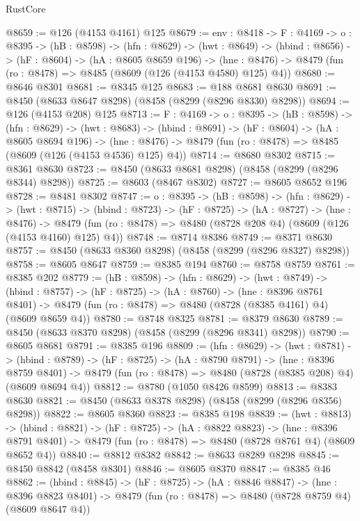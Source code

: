 \begin{lexlean}{RustCore}
\begin{coremodule}
@8659 := @126 (@4153 @4161) @125
@8679 := {env : @8418} ->
  {F : @4169} ->
  {o : @8395} ->
  (hB : @8598) ->
  (hfn : @8629) ->
  (hwt : @8649) ->
  (hbind : @8656) ->
  (hF : @8604) ->
  (hA : @8605 @8659 @196) ->
  (hne : @8476) -> @8479 (fun (ro : @8478) => @8485 (@8609 (@126 (@4153 @4580) @125) @4))
@8680 := @8646 @8301
@8681 := @8345 @125
@8683 := @188 @8681 @8630
@8691 := @8450 (@8633 @8647 @8298) (@8458 (@8299 (@8296 @8330) @8298))
@8694 := @126 (@4153 @208) @125
@8713 := {F : @4169} ->
  {o : @8395} ->
  (hB : @8598) ->
  (hfn : @8629) ->
  (hwt : @8683) ->
  (hbind : @8691) ->
  (hF : @8604) ->
  (hA : @8605 @8694 @196) ->
  (hne : @8476) -> @8479 (fun (ro : @8478) => @8485 (@8609 (@126 (@4153 @4536) @125) @4))
@8714 := @8680 @8302
@8715 := @8361 @8630
@8723 := @8450 (@8633 @8681 @8298) (@8458 (@8299 (@8296 @8344) @8298))
@8725 := @8603 (@8467 @8302)
@8727 := @8605 @8652 @196
@8728 := @8481 @8302
@8747 := {o : @8395} ->
  (hB : @8598) ->
  (hfn : @8629) ->
  (hwt : @8715) ->
  (hbind : @8723) ->
  (hF : @8725) ->
  (hA : @8727) ->
  (hne : @8476) ->
  @8479 (fun (ro : @8478) => @8480 (@8728 @208 @4) (@8609 (@126 (@4153 @4160) @125) @4))
@8748 := @8714 @8386
@8749 := @8371 @8630
@8757 := @8450 (@8633 @8360 @8298) (@8458 (@8299 (@8296 @8327) @8298))
@8758 := @8605 @8647
@8759 := @8385 @194
@8760 := @8758 @8759
@8761 := @8385 @202
@8779 := (hB : @8598) ->
  (hfn : @8629) ->
  (hwt : @8749) ->
  (hbind : @8757) ->
  (hF : @8725) ->
  (hA : @8760) ->
  (hne : @8396 @8761 @8401) ->
  @8479 (fun (ro : @8478) => @8480 (@8728 (@8385 @4161) @4) (@8609 @8659 @4))
@8780 := @8748 @8325
@8781 := @8379 @8630
@8789 := @8450 (@8633 @8370 @8298) (@8458 (@8299 (@8296 @8341) @8298))
@8790 := @8605 @8681
@8791 := @8385 @196
@8809 := (hfn : @8629) ->
  (hwt : @8781) ->
  (hbind : @8789) ->
  (hF : @8725) ->
  (hA : @8790 @8791) ->
  (hne : @8396 @8759 @8401) ->
  @8479 (fun (ro : @8478) => @8480 (@8728 (@8385 @208) @4) (@8609 @8694 @4))
@8812 := @8780 (@1050 @8426 @8599)
@8813 := @8383 @8630
@8821 := @8450 (@8633 @8378 @8298) (@8458 (@8299 (@8296 @8356) @8298))
@8822 := @8605 @8360
@8823 := @8385 @198
@8839 := (hwt : @8813) ->
  (hbind : @8821) ->
  (hF : @8725) ->
  (hA : @8822 @8823) ->
  (hne : @8396 @8791 @8401) -> @8479 (fun (ro : @8478) => @8480 (@8728 @8761 @4) (@8609 @8652 @4))
@8840 := @8812 @8382
@8842 := @8633 @8289 @8298
@8845 := @8450 @8842 (@8458 @8301)
@8846 := @8605 @8370
@8847 := @8385 @46
@8862 := (hbind : @8845) ->
  (hF : @8725) ->
  (hA : @8846 @8847) ->
  (hne : @8396 @8823 @8401) -> @8479 (fun (ro : @8478) => @8480 (@8728 @8759 @4) (@8609 @8647 @4))

\end{coremodule}
\end{lexlean}
